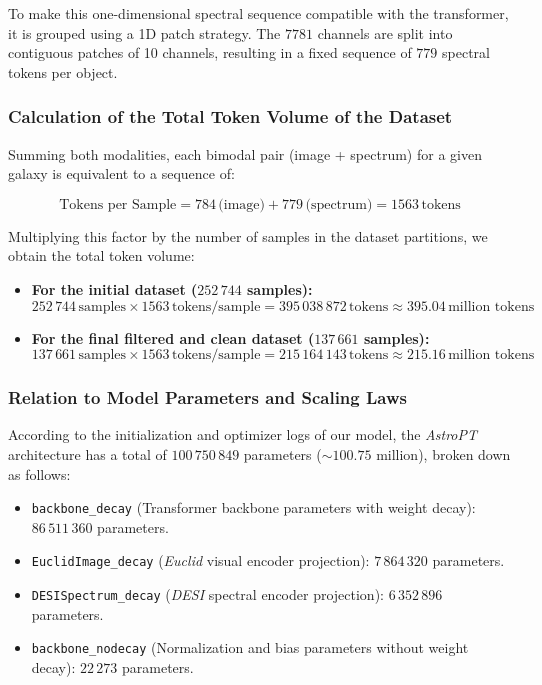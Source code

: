 To make this one-dimensional spectral sequence compatible with the transformer, it is grouped using a 1D patch strategy. The $7781$ channels are split into contiguous patches of 10 channels, resulting in a fixed sequence of $779$ spectral tokens per object.

\subsubsection{Calculation of the Total Token Volume of the Dataset}

Summing both modalities, each bimodal pair (image + spectrum) for a given galaxy is equivalent to a sequence of:

\begin{equation}
\text{Tokens per Sample} = 784\,\text{(image)} + 779\,\text{(spectrum)} = 1563\,\text{tokens}
\label{eq:tokens_por_muestra}
\end{equation}

Multiplying this factor by the number of samples in the dataset partitions, we obtain the total token volume:

\begin{itemize}
\item \textbf{For the initial dataset ($252\,744$ samples):}
    \begin{equation}
    252\,744\,\text{samples} \times 1563\,\text{tokens/sample} = 395\,038\,872\,\text{tokens} \approx 395.04\,\text{million tokens}
    \label{eq:tokens_total_inicial}
    \end{equation}
\item \textbf{For the final filtered and clean dataset ($137\,661$ samples):}
    \begin{equation}
    137\,661\,\text{samples} \times 1563\,\text{tokens/sample} = 215\,164\,143\,\text{tokens} \approx 215.16\,\text{million tokens}
    \label{eq:tokens_total_final}
    \end{equation}
\end{itemize}

\subsubsection{Relation to Model Parameters and Scaling Laws}

According to the initialization and optimizer logs of our model, the \textit{AstroPT} architecture has a total of $100\,750\,849$ parameters ($\sim 100.75$ million), broken down as follows:

\begin{itemize}
\item \texttt{backbone\_decay} (Transformer backbone parameters with weight decay): $86\,511\,360$ parameters.
\item \texttt{EuclidImage\_decay} (\textit{Euclid} visual encoder projection): $7\,864\,320$ parameters.
\item \texttt{DESISpectrum\_decay} (\textit{DESI} spectral encoder projection): $6\,352\,896$ parameters.
\item \texttt{backbone\_nodecay} (Normalization and bias parameters without weight decay): $22\,273$ parameters.
\end{itemize}

